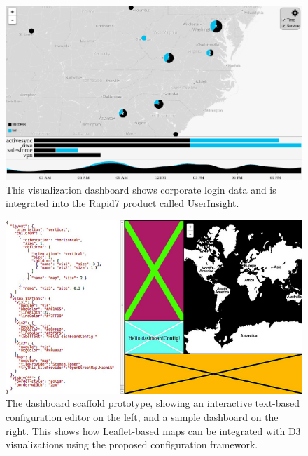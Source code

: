 \begin{figure}
  \centering
  \includegraphics[width=\figureWidth]{figs/mapDocs7.png}
  \caption[The Rapid7 Ingress Dashboard.]
   {This visualization dashboard shows corporate login data and is integrated into the Rapid7 product called UserInsight.}
  \label{fig:ingressDash}
\end{figure}

\begin{figure}
  \centering
  \includegraphics[width=\figureWidth]{figs/dashboardScaffold.png}
  \caption[Dashboard Scaffold Configuration Editor.]
   {The dashboard scaffold prototype, showing an interactive text-based configuration editor on the left, and a sample dashboard on the right. This shows how Leaflet-based maps can be integrated with D3 visualizations using the proposed configuration framework.}
  \label{fig:ingressDash}
\end{figure}

